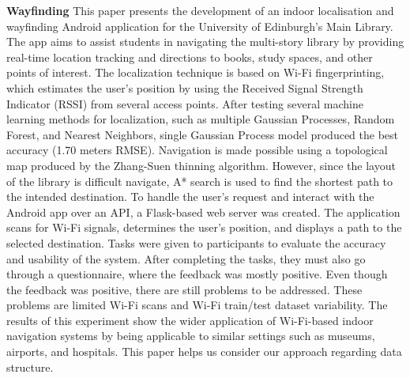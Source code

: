 \documentclass[conference]{IEEEtran}
\begin{document}
	\textbf{Wayfinding}
	This paper presents the development of an indoor localisation and wayfinding Android application for the University of Edinburgh’s Main Library. The app aims to assist students in navigating the multi-story library by providing real-time location tracking and directions to books, study spaces, and other points of interest. The localization technique is based on Wi-Fi fingerprinting, which estimates the user's position by using the Received Signal Strength Indicator (RSSI) from several access points. After testing several machine learning methods for localization, such as multiple Gaussian Processes, Random Forest, and Nearest Neighbors, single Gaussian Process model produced the best accuracy (1.70 meters RMSE). Navigation is made possible using a topological map produced by the Zhang-Suen thinning algorithm. However, since the layout of the library is difficult navigate, A* search is used to find the shortest path to the intended destination.
	To handle the user's request and interact with the Android app over an API, a Flask-based web server was created. The application scans for Wi-Fi signals, determines the user’s position, and displays a path to the selected destination. Tasks were given to participants to evaluate the accuracy and usability of the system. After completing the tasks, they must also go through a questionnaire, where the feedback was mostly positive. Even though the feedback was positive, there are still problems to be addressed. These problems are limited Wi-Fi scans and Wi-Fi train/test dataset variability. The results of this experiment show the wider application of Wi-Fi-based indoor navigation systems by being applicable to similar settings such as museums, airports, and hospitals. This paper helps us consider our approach regarding data structure.
	
\end{document}
